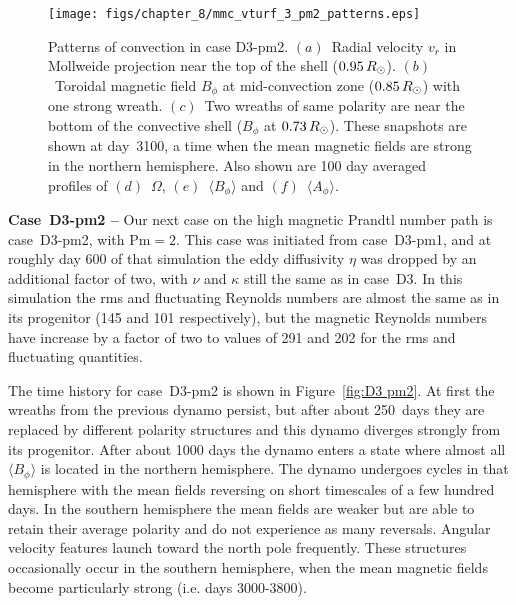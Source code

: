 \begin{figure}
  \begin{center}
    \texttt{[image: figs/chapter\_8/mmc\_vturf\_3\_pm2\_patterns.eps]}
  \end{center}
  \caption[Patterns of convection in case D3-pm2]
	  {Patterns of convection in case D3-pm2.  
  $(a)$~Radial velocity $v_r$ in Mollweide projection
  near the top of the shell ($0.95\thinspace R_\odot$).  
  $(b)$~Toroidal magnetic field $B_\phi$ at mid-convection zone
  ($0.85\thinspace R_\odot$) with one strong wreath.
  $(c)$~Two wreaths of same polarity are near the bottom of the
  convective shell ($B_\phi$ at $0.73\thinspace R_\odot$).
  These snapshots are shown at day~3100, a time when the mean
  magnetic fields are strong in the northern hemisphere.
  Also shown are 100 day averaged profiles of $(d)$~$\Omega$, 
  $(e)$~$\langle B_\phi \rangle$ and
  $(f)$~$\langle A_\phi \rangle$.
  \label{fig:D3 pm2 convection}} 
\end{figure}


\textbf{Case~D3-pm2 --} Our next case on the high magnetic Prandtl number path is case~D3-pm2,
with $\mathrm{Pm}=2$.  This case was initiated from case~D3-pm1, and
at roughly day 600 of that simulation the eddy diffusivity $\eta$ was
dropped by an additional factor of two, with $\nu$ and $\kappa$ still
the same as in case~D3.  
In this simulation the rms and fluctuating Reynolds numbers are almost
the same as in its progenitor (145 and 101 respectively), but the
magnetic Reynolds numbers have increase by a factor of two to values
of 291 and 202 for the rms and fluctuating quantities.

The time history for case~D3-pm2 is shown in
Figure~\ref{fig:D3 pm2}.  At first the wreaths
from the previous dynamo persist, but after about 250~days they are
replaced by different polarity structures and this dynamo diverges
strongly from its progenitor.  After about 1000 days the dynamo enters a
state where almost all $\langle B_\phi \rangle$ is located in the
northern hemisphere.  The dynamo undergoes cycles in that hemisphere
with the mean fields reversing on short timescales of a few hundred
days.  In the southern hemisphere the mean fields are weaker but are
able to retain their average polarity and do not experience as many
reversals.  Angular velocity features launch toward the north pole
frequently.  These structures occasionally occur in the southern
hemisphere, when the mean magnetic fields become particularly strong
(i.e. days 3000-3800).




